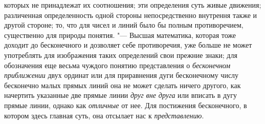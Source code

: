 которых не принадлежат их соотношения; эти определения суть живые движения;
различенная определенность одной стороны непосредственно внутрення также и
другой стороне; то, что для чисел и линий было бы полным
противоречием, существенно для природы понятия. "--- Высшая
математика, которая тоже доходит до бесконечного и дозволяет себе
противоречия, уже больше не может употреблять для изображения таких
определений свои прежние знаки; для обозначения еще весьма чуждого понятию
представления о {\em бесконечном
приближении} двух ординат или для приравнения дуги
бесконечному числу бесконечно малых прямых линий она не может сделать
ничего другого, как начертить указанные две прямые линии
{\em друг вне друга} или
вписать в дугу прямые линии, однако как
{\em отличные} от нее.
Для постижения бесконечного, в котором здесь главная суть, она отсылает нас
к {\em представлению}.

